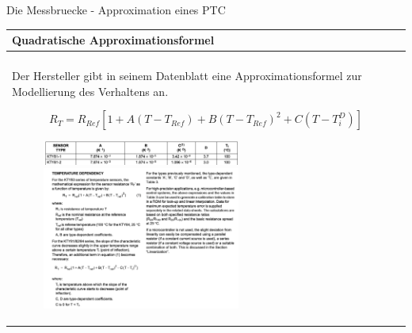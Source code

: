 \begin{frame}[t]{Die Messbruecke - Approximation eines PTC} 
    
    \begin{spacing}{0.9} \begin{tiny}
      \begin{table}[h!]
      \begin{tabular}{p{10cm}}
        \hline
        \textbf{Quadratische Approximationsformel} \\
        \hline \\
        \begin{minipage}{\textwidth}
            Der Hersteller gibt in seinem Datenblatt eine Approximationsformel zur Modellierung des Verhaltens an.

            \begin{equation}
                R_T=R_{Ref}[1+A(T-T_{Ref})+B(T-T_{Ref})^2+C(T-T_{i}^D)]
            \end{equation}
            \begin{figure}
                \centering
                \includegraphics[width=0.6\textwidth]{pictures/kty81_constants.png}
                \includegraphics[width=0.6\textwidth]{pictures/kty81_formula.png}
            \end{figure}
        \end{minipage} 
    \end{tabular}

    \end{table}
     
    \end{tiny} \end{spacing}

\end{frame}

